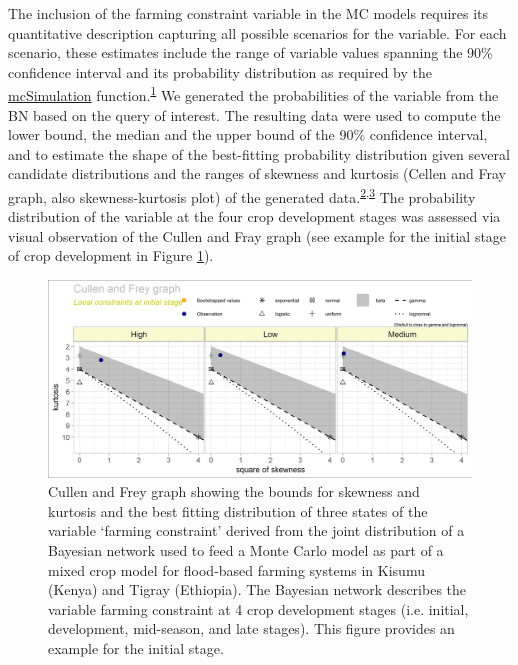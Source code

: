 \documentclass[]{elsarticle} %
\begin{document}
The inclusion of the farming constraint variable in the MC models requires its quantitative description capturing all possible scenarios for the variable. For each scenario, these estimates include the range of variable values spanning the 90\% confidence interval and its probability distribution as required by the \href{https://www.rdocumentation.org/packages/decisionSupport/versions/1.103.8/topics/mcSimulation}{mcSimulation} function.\textsuperscript{\protect\hyperlink{ref-Luedeling_Goehring_et_al_2019}{1}} We generated the probabilities of the variable from the BN based on the query of interest. The resulting data were used to compute the lower bound, the median and the upper bound of the 90\% confidence interval, and to estimate the shape of the best-fitting probability distribution given several candidate distributions and the ranges of skewness and kurtosis (Cellen and Fray graph, also skewness-kurtosis plot) of the generated data.\textsuperscript{\protect\hyperlink{ref-Cullen_and_Frey_1999}{2},\protect\hyperlink{ref-Delignette-Muller_and_Dutang_2015}{3}} The probability distribution of the variable at the four crop development stages was assessed via visual observation of the Cullen and Fray graph (see example for the initial stage of crop development in Figure \ref{fig:fig7}).

\begin{figure}[!h]

{\centering \includegraphics[width=1\linewidth,]{figures/Local_constraints_at_initial_stage_ggplot_distributions} 

}

\caption{Cullen and Frey graph showing the bounds for skewness and kurtosis and the best fitting distribution of three states of the variable ‘farming constraint’ derived from the joint distribution of a Bayesian network used to feed a Monte Carlo model as part of a mixed crop model for flood-based farming systems in Kisumu (Kenya) and Tigray (Ethiopia). The Bayesian network describes the variable farming constraint at 4 crop development stages (i.e. initial, development, mid-season, and late stages). This figure provides an example for the initial stage.}\label{fig:fig7}
\end{figure}
\end{document}
